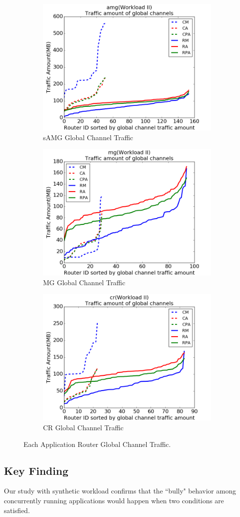 \documentclass[conference,compsoc]{IEEEtran}
\begin{document}
\begin{figure}[t!]
    \centering
    \begin{subfigure}[t]{0.32\textwidth}
        \centering
        \includegraphics[height=1.5 in]{syn-wkld/amg10/gc-traffic}
        \caption{sAMG Global Channel Traffic}
        \label{fig:syn-samg-gc-traffic}
    \end{subfigure}%
    \hspace{1em}%
    \begin{subfigure}[t]{0.32\textwidth}
        \centering
        \includegraphics[height=1.5 in]{syn-wkld/mg/gc-traffic}
        \caption{MG Global Channel Traffic}
        \label{fig:syn-mg-gc-traffic}
    \end{subfigure}%
    \begin{subfigure}[t]{0.32\textwidth}
        \centering
        \includegraphics[height=1.5 in]{syn-wkld/cr/gc-traffic}
        \caption{CR Global Channel Traffic}
        \label{fig:syn-cr-gc-traffic}
    \end{subfigure}%
   \caption{Each Application Router Global Channel Traffic.}
   \label{fig:syn-3app-gc-traffic}
\end{figure}




\subsection{Key Finding}
Our study with synthetic workload confirms that the ``bully" behavior among concurrently running applications would happen when two conditions are satisfied.
\end{document}
